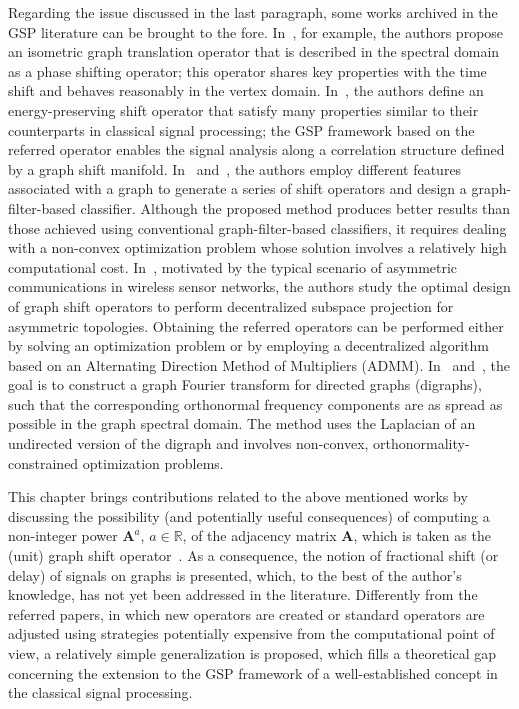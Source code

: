     {Regarding the issue discussed in the last paragraph, some works archived in the GSP literature can be brought to the fore. In~\cite{girault2015translation}, for example, the authors propose an isometric graph translation operator that is described in the spectral domain as a phase shifting operator; this operator shares key properties with the time shift and behaves reasonably in the vertex domain. In~\cite{gavili2017}, the authors define an energy-preserving shift operator that satisfy many properties similar to their counterparts in classical signal processing; the GSP framework based on the referred operator enables the signal analysis along a correlation structure defined by a graph shift manifold. In~\cite{fan20191} and~\cite{fan2019}, the authors employ different features associated with a graph to generate a series of shift operators and design a graph-filter-based classifier. Although the proposed method produces better results than those achieved using conventional graph-filter-based classifiers, it requires dealing with a non-convex optimization problem whose solution involves a relatively high computational cost. In~\cite{mollaebrahim2021}, motivated by the typical scenario of asymmetric communications in wireless sensor networks, the authors study the optimal design of graph shift operators to perform decentralized subspace projection for asymmetric topologies. Obtaining the referred operators can be performed either by solving an optimization problem or by employing a decentralized algorithm based on an Alternating Direction Method of Multipliers (ADMM). In~\cite{shafipour2018} and~\cite{shafipour2019}, the goal is to construct a graph Fourier transform for directed graphs (digraphs), such that the corresponding orthonormal frequency components are as spread as possible in the graph spectral domain. The method uses the Laplacian of an undirected version of the digraph and involves non-convex, orthonormality-constrained optimization problems.}

    {This chapter brings contributions related to the above mentioned works by discussing the} possibility (and potentially useful consequences) of {computing} a non-integer power $\mathbf{A}^a$, $a\in\mathbb{R}$, of the adjacency matrix $\mathbf{A}$, {which is taken as} the (unit) graph shift operator~\cite{sandryhaila2014big}. {As a consequence}, the notion of fractional shift (or delay) of signals on graphs is presented, {which, to the best of the author's knowledge, has not yet been addressed in the literature. Differently from the referred papers, in which new operators are created or standard operators are adjusted using strategies potentially expensive from the computational point of view, a relatively simple generalization is proposed, which fills a theoretical gap concerning the extension to the GSP framework of a well-established concept in the classical signal processing.}


